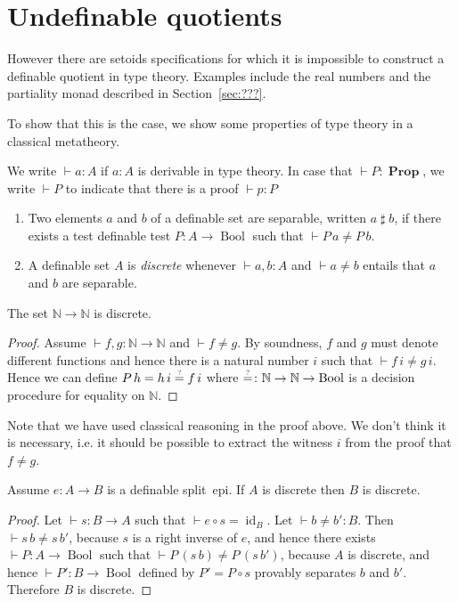 \documentclass[envcountsame]{llncs}
\newcommand{\N}{\mathbb{N}}
\DeclareMathOperator{\Prop}{\mathbf{Prop}}
\DeclareMathOperator{\Bool}{Bool}
\DeclareMathOperator{\id}{id}
\newcommand{\eqqm}{\overset{\text{\tiny ?}}{=}}
\newcommand{\sep}{\mathrel{\sharp}}
\begin{document}
\section{Undefinable quotients}
However there are setoids specifications for which it is impossible to construct a definable quotient in type theory. Examples include the real numbers and the partiality monad described in Section~\ref{sec:???}.

To show that this is the case, we show some properties of type theory in a classical metatheory.

We write $\vdash a\colon A$ if $a\colon A$ is derivable in type theory. In case that $\vdash P\colon \Prop$, we write $\vdash P$ to indicate that there is a proof $\vdash p\colon P$
\begin{definition}\hfill
\begin{enumerate}
\item Two elements $a$ and $b$ of a definable set are separable, written $a \sep b$, if there exists a test definable test $P\colon A\to \Bool$ such that $\vdash P\,a \neq P\,b$. 
\item A definable set $A$ is \emph{discrete} whenever $\vdash a, b\colon A$ and   $\vdash a\not= b$
entails that $a$ and $b$ are separable.
\end{enumerate}
\end{definition}
\begin{proposition}\label{prop:NtoNdiscrete}
The set $\N\to\N$ is discrete. 
\end{proposition}
\begin{proof}
Assume $\vdash f, g\colon \N \to \N$ and $\vdash f\neq g$. By soundness, $f$ and $g$ must denote different functions and hence there is a natural number $i$ such that $\vdash f\,i\neq g\,i$. Hence we can define $P\,h = {h\,i} \eqqm {f\,i}$ where ${\eqqm}\colon \N\to\N\to\Bool$ is a decision procedure for equality on $\N$. 
\end{proof}

Note that we have used classical reasoning in the proof above. We don't think it is necessary, i.e. it should be possible to extract the witness $i$ from the proof that $f\neq g$.

\begin{proposition}\label{prop:splitepidiscrete}
Assume $ e\colon A\to B$ is a definable split~epi.  If $A$ is discrete then $B$ is discrete.
\end{proposition}
\begin{proof}
Let $\vdash s\colon B\to A$ such that $\vdash e\circ s=\id_B$. Let $\vdash b\neq b'\colon B$. Then $\vdash s\,b\neq s\,b'$, because $s$ is a right inverse of $e$, and hence there exists $\vdash P\colon A\to\Bool$ such that $\vdash P\,(s\,b)\neq P\,(s\,b')$, because $A$ is discrete, and hence $\vdash P'\colon B\to\Bool$ defined by $P' = P\circ s$ provably separates $b$ and $b'$.
Therefore $B$ is discrete.
\end{proof}
\end{document}
